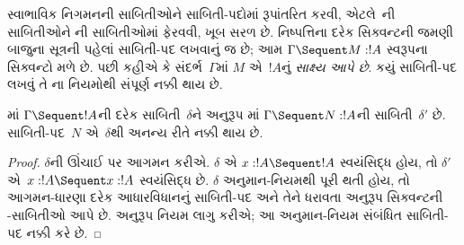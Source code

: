 \begingroup
\makeatletter{}\makeatother


\label{guunit:OLP-0689}


સ્વાભાવિક નિગમનની સાબિતીઓને સાબિતી-પદોમાં
રૂપાંતરિત કરવી, એટલે~ની સાબિતીઓને
ની સાબિતીઓમાં ફેરવવી, ખૂબ
સરળ છે. નિષ્પત્તિના દરેક સિક્વન્ટની
જમણી બાજુના સૂત્રની પહેલાં
સાબિતી-પદ લખવાનું જ છે; આમ
$\Gamma \Sequent M : !A$ સ્વરૂપના
સિક્વન્ટો મળે છે. પછી કહીએ કે
સંદર્ભ~$\Gamma$માં $M$ એ~$!A$નું
\emph{સાક્ષ્ય આપે છે}. કયું સાબિતી-પદ
લખવું તે ના નિયમોથી
સંપૂર્ણ નક્કી થાય છે.

\begin{prop}
માં $\Gamma \Sequent !A$ની
દરેક સાબિતી~$\delta$ને અનુરૂપ
માં $\Gamma \Sequent N : !A$ની
સાબિતી~$\delta'$ છે. સાબિતી-પદ~$N$
એ~$\delta$થી અનન્ય રીતે નક્કી થાય છે.
\end{prop}

\begin{proof}
$\delta$ની ઊંચાઈ પર આગમન કરીએ.
$\delta$ એ $x:!A \Sequent !A$ સ્વયંસિદ્ધ હોય,
તો $\delta'$ એ~$x:!A \Sequent x:!A$
સ્વયંસિદ્ધ છે. $\delta$ અનુમાન-નિયમથી
પૂરી થતી હોય, તો આગમન-ધારણા દરેક
આધારવિધાનનું સાબિતી-પદ અને તેને ધરાવતા
અનુરૂપ સિક્વન્ટની -સાબિતીઓ
આપે છે. અનુરૂપ  નિયમ
લાગુ કરીએ; આ  અનુમાન-નિયમ સંબંધિત
સાબિતી-પદ નક્કી કરે છે.
\end{proof}

